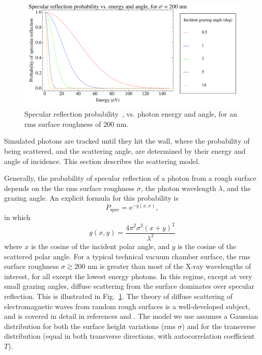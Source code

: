 \documentclass[11pt,openany]{report}
\begin{document}
  \begin{figure}
  \centering
  \includegraphics[width=6in]{specular-probability.pdf}
  \caption[Specular reflection probability vs. photon energy and angle]
{\label{f:spec.prob}
Specular reflection probability~\cite{b:beckmann}, vs. photon energy
and angle, for an rms surface roughness of 200 nm.}
  \end{figure}
   
Simulated photons are tracked until they hit the wall, where the
probability of being scattered, and the scattering angle, are
determined by their energy and angle of incidence.  This section
describes the scattering model.

Generally, the probability of specular reflection of a photon from a
rough surface depends on the the rms surface roughness $\sigma$, the
photon wavelength $\lambda$, and the grazing angle. An explicit
formula for this probability is~\cite{b:beckmann}
   \begin{equation}
P_{\textrm{spec}}=\textrm{e}^{-g(x,x)},
\end{equation}
in which
   \begin{equation}
g(x,y)=\frac{4\pi^{2}\sigma^{2}(x+y)^{2}}{\lambda^{2}}
  \end{equation}
where $x$ is the cosine of the incident polar angle, and $y$ is the
cosine of the scattered polar angle. For a typical technical vacuum
chamber surface, the rms surface roughness $\sigma \gtrsim 200$ nm is
greater than most of the X-ray wavelengths of interest, for all except
the lowest energy photons. In this regime, except at very small
grazing angles, diffuse scattering from the surface dominates over
specular reflection. This is illustrated in Fig.~\ref{f:spec.prob}.
The theory of diffuse scattering of electromagnetic waves from random
rough surfaces is a well-developed subject, and is covered in detail
in references \cite{b:beckmann} and \cite{b:ogilvy}. The model we use
assumes a Gaussian distribution for both the surface height variations
(rms $\sigma$) and for the transverse distribution (equal in both
transverse directions, with autocorrelation coefficient $T$).
\end{document}
